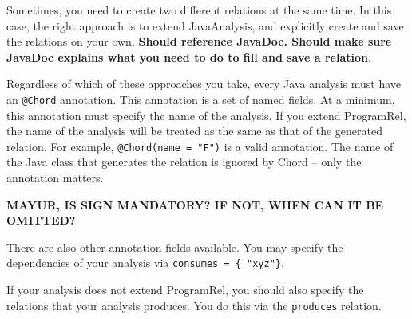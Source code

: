 Sometimes, you need to create two different relations at the same time. In this case, the right approach is to
extend JavaAnalysis, and explicitly create and save the relations on your own.
\textbf{Should reference JavaDoc.  Should make sure JavaDoc explains what you need to do to fill and save a relation}.

Regardless of which of these approaches you take, every Java analysis must have an \texttt{@Chord} annotation.
This annotation is a set of named fields.
At a minimum, this annotation must specify the name of the analysis.
If you extend ProgramRel, the name of the analysis will be treated as the same as that of the generated relation.
For example, \texttt{@Chord(name = "F")} is a valid annotation. 
The name of the Java class that generates the relation is ignored by Chord -- only the annotation matters.

\textbf{MAYUR, IS SIGN MANDATORY?   IF NOT, WHEN CAN IT BE OMITTED?}

There are also other annotation fields available.
You may specify the dependencies of your analysis via \texttt{consumes = \{ "xyz"\}}.

If your analysis does not extend ProgramRel, you should also specify the relations that your 
analysis produces. You do this via the \texttt{produces} relation.

%
%